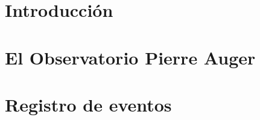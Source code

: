 \documentclass[12pt,papel,oneside]{ibtesis}
\begin{document}
 \chapter{Introducción}
	\graphicspath{{../01_Introduccion/}}
	
  
 \chapter{El Observatorio Pierre Auger}
	\graphicspath{{../02_IntroduccionAuger/}}
	

 \chapter{Registro de eventos}
	\graphicspath{{../03_IntroduccionReport/}}
	

% 	


% 	
% 	

% 	
	

% 	
	
	
% 	
\end{document}
